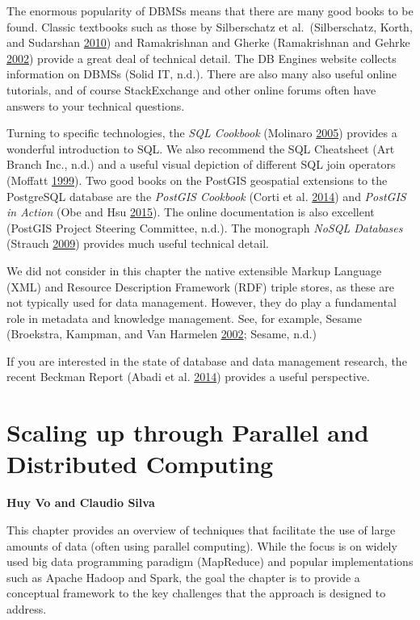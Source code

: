 \documentclass[]{krantz}
\begin{document}
The enormous popularity of DBMSs means that there are many good books to
be found. Classic textbooks such as those by Silberschatz et
al.~(Silberschatz, Korth, and Sudarshan
\protect\hyperlink{ref-silberschatz2010database}{2010}) and Ramakrishnan
and Gherke (Ramakrishnan and Gehrke
\protect\hyperlink{ref-ramakrishnan2000database}{2002}) provide a great
deal of technical detail. The DB Engines website collects information on
DBMSs (Solid IT, n.d.). There are also many also useful online
tutorials, and of course StackExchange and other online forums often
have answers to your technical questions.

Turning to specific technologies, the \emph{SQL Cookbook} (Molinaro
\protect\hyperlink{ref-SQLCookbook}{2005}) provides a wonderful
introduction to SQL. We also recommend the SQL Cheatsheet (Art Branch
Inc., n.d.) and a useful visual depiction of different SQL join
operators (Moffatt \protect\hyperlink{ref-vizjoins}{1999}). Two good
books on the PostGIS geospatial extensions to the PostgreSQL database
are the \emph{PostGIS Cookbook} (Corti et al.
\protect\hyperlink{ref-PostGISCookbook}{2014}) and \emph{PostGIS in
Action} (Obe and Hsu \protect\hyperlink{ref-PostGISInAction}{2015}). The
online documentation is also excellent (PostGIS Project Steering
Committee, n.d.). The monograph \emph{NoSQL Databases} (Strauch
\protect\hyperlink{ref-NoSQLdatabases}{2009}) provides much useful
technical detail.

We did not consider in this chapter the native extensible Markup
Language (XML) and Resource Description Framework (RDF) triple stores,
as these are not typically used for data management. However, they do
play a fundamental role in metadata and knowledge management. See, for
example, Sesame (Broekstra, Kampman, and Van Harmelen
\protect\hyperlink{ref-broekstra2002sesame}{2002}; Sesame, n.d.)

If you are interested in the state of database and data management
research, the recent Beckman Report (Abadi et al.
\protect\hyperlink{ref-abadi2014beckman}{2014}) provides a useful
perspective.

\chapter{Scaling up through Parallel and Distributed
Computing}\label{chap:parallel}

\textbf{Huy Vo and Claudio Silva}

This chapter provides an overview of techniques that facilitate the use
of large amounts of data (often using parallel computing). While the
focus is on widely used big data programming paradigm (MapReduce) and
popular implementations such as Apache Hadoop and Spark, the goal the
chapter is to provide a conceptual framework to the key challenges that
the approach is designed to address.
\end{document}
